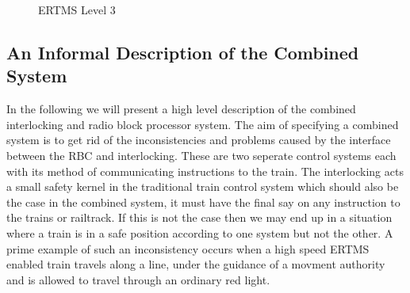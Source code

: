 \begin{center}
\begin{figure}[h!]



 \caption{ERTMS Level 3}
\label{fig:ERTMSLevel3}
\end{figure}
\end{center}






\subsection*{An Informal Description of the Combined System}
In the following we will present a high level description of the combined interlocking and radio block processor system. The aim of specifying a combined system is to get rid of the inconsistencies and problems caused by the interface between the RBC and interlocking.  These are two seperate control systems each with its method of communicating instructions to the train. The interlocking acts a small safety kernel in the traditional train control system which should also be the case in the combined system, it must have the final say on any instruction to the trains or railtrack. If this is not the case then we may end up in a situation where a train is in a safe position according to one system but not the other. A prime example of such an inconsistency occurs when a high speed ERTMS enabled train travels along a line, under the guidance of a movment authority and is allowed to travel through an ordinary red light.  





